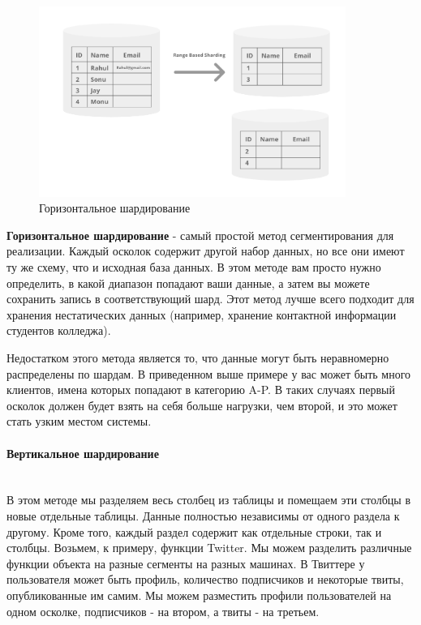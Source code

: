 \begin{figure}[H]
    \centering
    \includegraphics[width=100mm]{assets/distributed/Horizontal-Sharding}
    \caption{Горизонтальное шардирование}
    \label{fig:Horizontal-Sharding}
\end{figure}

\textbf{Горизонтальное шардирование} - самый простой метод сегментирования для реализации. Каждый осколок содержит
другой набор данных, но все они имеют ту же схему, что и исходная база данных. В этом методе вам просто нужно
определить, в какой диапазон попадают ваши данные, а затем вы можете сохранить запись в соответствующий шард. Этот
метод лучше всего подходит для хранения нестатических данных (например, хранение контактной информации студентов
колледжа).

Недостатком этого метода является то, что данные могут быть неравномерно распределены по шардам. В приведенном выше
примере у вас может быть много клиентов, имена которых попадают в категорию A-P. В таких случаях первый осколок должен
будет взять на себя больше нагрузки, чем второй, и это может стать узким местом системы. \autocite{DatabaseSharding}

\paragraph{Вертикальное шардирование} ~\\
В этом методе мы разделяем весь столбец из таблицы и помещаем эти столбцы в новые отдельные таблицы. Данные полностью
независимы от одного раздела к другому. Кроме того, каждый раздел содержит как отдельные строки, так и столбцы. Возьмем,
к примеру, функции Twitter. Мы можем разделить различные функции объекта на разные сегменты на разных машинах. В
Твиттере у пользователя может быть профиль, количество подписчиков и некоторые твиты, опубликованные им самим. Мы можем
разместить профили пользователей на одном осколке, подписчиков - на втором, а твиты - на третьем.

